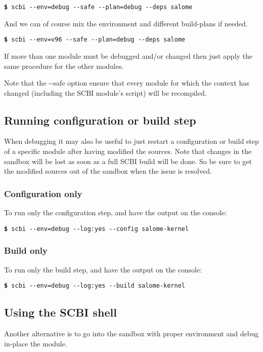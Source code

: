 \documentclass[a4paper,12pt,twoside]{article}
\newcommand{\cmd}[1]{\tabto{1cm}\hspace{0.5cm}\texttt{\textbf{\$} #1}}
\newcommand{\ddash}{-{}-}
\begin{document}
\cmd{scbi \ddash{}env=debug \ddash{}safe \ddash{}plan=debug \ddash{}deps salome}

And we can of course mix the environment and different build-plans if needed.

\cmd{scbi \ddash{}env=v96 \ddash{}safe \ddash{}plan=debug \ddash{}deps salome}

If more than one module must be debugged and/or changed then just apply the same procedure for the other modules.

Note that the \ddash{}safe option ensure that every module for which the context has changed (including the SCBI module's script) will be recompiled.

\subsection{Running configuration or build step}

When debugging it may also be useful to just restart a configuration or build step of a specific module after having modified the sources. Note that changes in the sandbox will be lost as soon as a full SCBI build will be done. So be sure to get the modified sources out of the sandbox when the issue is resolved.

\subsubsection{Configuration only}

To run only the configuration step, and have the output on the console:

\cmd{scbi \ddash{}env=debug \ddash{}log:yes \ddash{}config salome-kernel}

\subsubsection{Build only}

To run only the build step, and have the output on the console:

\cmd{scbi \ddash{}env=debug \ddash{}log:yes \ddash{}build salome-kernel}

\subsection{Using the SCBI shell}

Another alternative is to go into the sandbox with proper environment and debug in-place the module.
\end{document}
